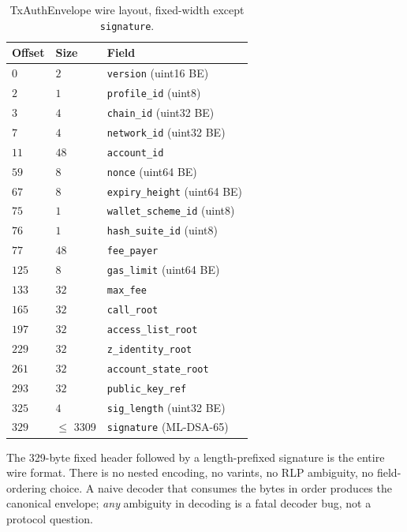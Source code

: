 \begin{table}[H]
\centering
\caption{TxAuthEnvelope wire layout, fixed-width except \texttt{signature}.}
\begin{tabular}{lll}
\toprule
Offset & Size & Field \\
\midrule
$0$    & $2$   & \texttt{version}            (uint16 BE) \\
$2$    & $1$   & \texttt{profile\_id}        (uint8) \\
$3$    & $4$   & \texttt{chain\_id}          (uint32 BE) \\
$7$    & $4$   & \texttt{network\_id}        (uint32 BE) \\
$11$   & $48$  & \texttt{account\_id} \\
$59$   & $8$   & \texttt{nonce}              (uint64 BE) \\
$67$   & $8$   & \texttt{expiry\_height}     (uint64 BE) \\
$75$   & $1$   & \texttt{wallet\_scheme\_id} (uint8) \\
$76$   & $1$   & \texttt{hash\_suite\_id}    (uint8) \\
$77$   & $48$  & \texttt{fee\_payer} \\
$125$  & $8$   & \texttt{gas\_limit}         (uint64 BE) \\
$133$  & $32$  & \texttt{max\_fee} \\
$165$  & $32$  & \texttt{call\_root} \\
$197$  & $32$  & \texttt{access\_list\_root} \\
$229$  & $32$  & \texttt{z\_identity\_root} \\
$261$  & $32$  & \texttt{account\_state\_root} \\
$293$  & $32$  & \texttt{public\_key\_ref} \\
$325$  & $4$   & \texttt{sig\_length}        (uint32 BE) \\
$329$  & $\le$ 3309 & \texttt{signature}     (ML-DSA-65) \\
\bottomrule
\end{tabular}
\end{table}

The 329-byte fixed header followed by a length-prefixed signature is the
entire wire format. There is no nested encoding, no varints, no RLP
ambiguity, no field-ordering choice. A naive decoder that consumes the bytes
in order produces the canonical envelope; \emph{any} ambiguity in decoding is
a fatal decoder bug, not a protocol question.
